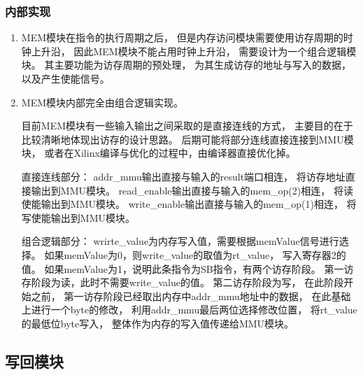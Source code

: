         \subsubsection{内部实现}
            \begin{enumerate}
            \item
            MEM模块在指令的执行周期之后，%
            但是内存访问模块需要使用访存周期的时钟上升沿，%
            因此MEM模块不能占用时钟上升沿，%
            需要设计为一个组合逻辑模块。%
            其主要功能为访存周期的预处理，%
            为其生成访存的地址与写入的数据，以及产生使能信号。
            \item
            MEM模块内部完全由组合逻辑实现。%

            目前MEM模块有一些输入输出之间采取的是直接连线的方式，%
            主要目的在于比较清晰地体现出访存的设计思路。%
            后期可能将部分连线直接连接到MMU模块，%
            或者在Xilinx编译与优化的过程中，由编译器直接优化掉。

            直接连线部分：%
            addr\_mmu输出直接与输入的result端口相连，%
            将访存地址直接输出到MMU模块。%
            read\_enable输出直接与输入的mem\_op(2)相连，%
            将读使能输出到MMU模块。%
            write\_enable输出直接与输入的mem\_op(1)相连，
            将写使能输出到MMU模块。
        
            组合逻辑部分：%
            wrirte\_value为内存写入值，需要根据memValue信号进行选择。%
            如果memValue为0，则write\_value的取值为rt\_value，%
            写入寄存器2的值。%
            如果memValue为1，说明此条指令为SB指令，有两个访存阶段。%
            第一访存阶段为读，此时不需要write\_value的值。%
            第二访存阶段为写，%
            在此阶段开始之前，%
            第一访存阶段已经取出内存中addr\_mmu地址中的数据，%
            在此基础上进行一个byte的修改，%
            利用addr\_mmu最后两位选择修改位置，%
            将rt\_value的最低位byte写入，%
            整体作为内存的写入值传递给MMU模块。%
        \end{enumerate}
    \subsection{写回模块}
